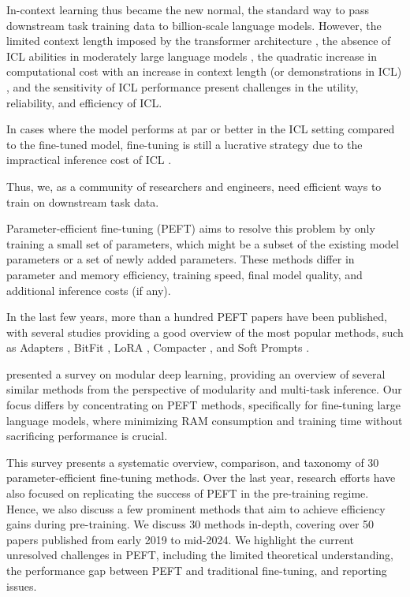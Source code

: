 
In-context learning \citep{radford2019language} thus became the new normal, the standard way to pass downstream task training data to billion-scale language models. However, the limited context length imposed by the transformer architecture \citep{vaswani2017attention, huang2018music}, the absence of ICL abilities in moderately large language models \citep{lu2023emergent}, the quadratic increase in computational cost with an increase in context length (or demonstrations in ICL) \citep{keles2023computational}, and the sensitivity of ICL performance \citep{bertsch2024context} present challenges in the utility, reliability, and efficiency of ICL. 

In cases where the model performs at par or better in the ICL setting compared to the fine-tuned model, fine-tuning is still a lucrative strategy due to the impractical inference cost of ICL \citep{bertsch2024context}.

Thus, we, as a community of researchers and engineers, need efficient ways to train on downstream task data.

Parameter-efficient fine-tuning (PEFT) aims to resolve this problem by only training a small set of parameters, which might be a subset of the existing model parameters or a set of newly added parameters. These methods differ in parameter and memory efficiency, training speed, final model quality, and additional inference costs (if any).

In the last few years, more than a hundred PEFT papers have been published, with several studies \citep{delta_tuning} providing a good overview of the most popular methods, such as Adapters \citep{adapters}, BitFit \citep{bitfit}, LoRA \citep{lora}, Compacter \citep{compacter}, and Soft Prompts \citep{p_tuning,prefix_tuning}.

\citet{modular_deep_learning} presented a survey on modular deep learning, providing an overview of several similar methods from the perspective of modularity and multi-task inference. Our focus differs by concentrating on PEFT methods, specifically for fine-tuning large language models, where minimizing RAM consumption and training time without sacrificing performance is crucial.

This survey presents a systematic overview, comparison, and taxonomy of 30 parameter-efficient fine-tuning methods. Over the last year, research efforts have also focused on replicating the success of PEFT in the pre-training regime. Hence, we also discuss a few prominent methods that aim to achieve efficiency gains during pre-training. We discuss 30 methods in-depth, covering over 50 papers published from early 2019 to mid-2024. We highlight the current unresolved challenges in PEFT, including the limited theoretical understanding, the performance gap between PEFT and traditional fine-tuning, and reporting issues.

